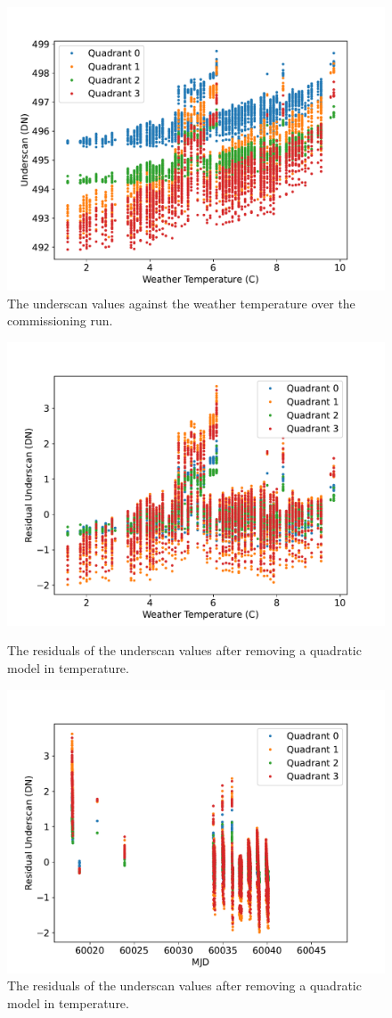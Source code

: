\documentclass{article}
\begin{document}
\begin{figure}[pb]
\begin{center}
\includegraphics[width=0.7\columnwidth]{figures/underscan-temperature.pdf}
\medskip
\caption{The underscan values against the weather temperature over the commissioning run.}
\label{figure:underscan-temperature}
\end{center}
\end{figure}

\begin{figure}[pb]
\begin{center}
\includegraphics[width=0.7\columnwidth]{figures/underscan-residual-temperature.pdf}
\medskip
\caption{The residuals of the underscan values after removing a quadratic model in temperature.}
\label{figure:underscan-residual-temperature}
\end{center}
\begin{center}
\includegraphics[width=0.7\columnwidth]{figures/underscan-residual-time.pdf}
\medskip
\caption{The residuals of the underscan values after removing a quadratic model in temperature.}
\label{figure:underscan-residual-time}
\end{center}
\end{figure}
\end{document}
